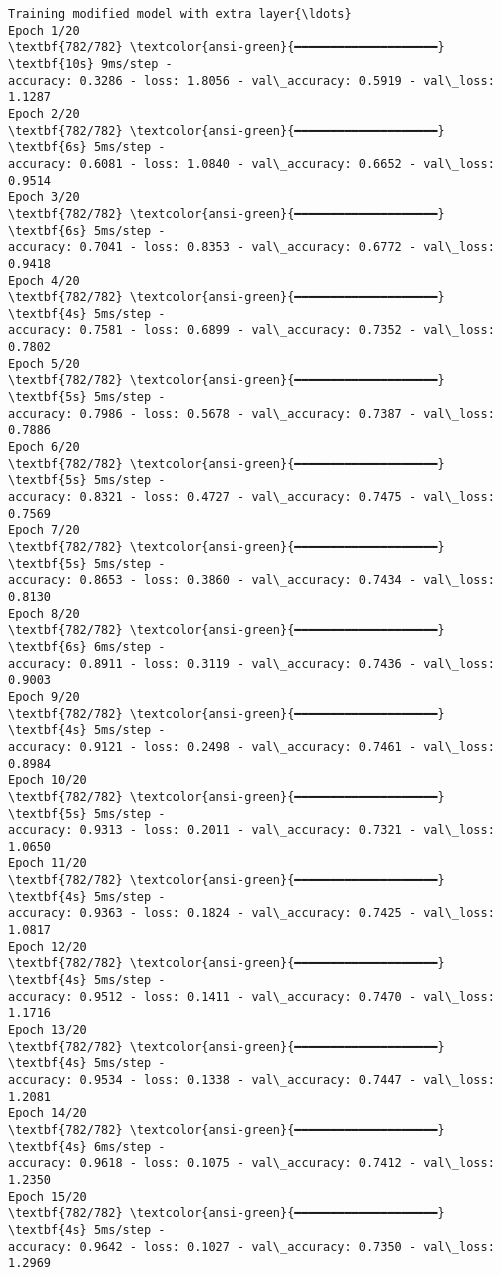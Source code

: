 \documentclass[11pt]{article}
\begin{document}
\begin{Verbatim}[commandchars=\\\{\}]
Training modified model with extra layer{\ldots}
Epoch 1/20
\textbf{782/782} \textcolor{ansi-green}{━━━━━━━━━━━━━━━━━━━━} \textbf{10s} 9ms/step -
accuracy: 0.3286 - loss: 1.8056 - val\_accuracy: 0.5919 - val\_loss: 1.1287
Epoch 2/20
\textbf{782/782} \textcolor{ansi-green}{━━━━━━━━━━━━━━━━━━━━} \textbf{6s} 5ms/step -
accuracy: 0.6081 - loss: 1.0840 - val\_accuracy: 0.6652 - val\_loss: 0.9514
Epoch 3/20
\textbf{782/782} \textcolor{ansi-green}{━━━━━━━━━━━━━━━━━━━━} \textbf{6s} 5ms/step -
accuracy: 0.7041 - loss: 0.8353 - val\_accuracy: 0.6772 - val\_loss: 0.9418
Epoch 4/20
\textbf{782/782} \textcolor{ansi-green}{━━━━━━━━━━━━━━━━━━━━} \textbf{4s} 5ms/step -
accuracy: 0.7581 - loss: 0.6899 - val\_accuracy: 0.7352 - val\_loss: 0.7802
Epoch 5/20
\textbf{782/782} \textcolor{ansi-green}{━━━━━━━━━━━━━━━━━━━━} \textbf{5s} 5ms/step -
accuracy: 0.7986 - loss: 0.5678 - val\_accuracy: 0.7387 - val\_loss: 0.7886
Epoch 6/20
\textbf{782/782} \textcolor{ansi-green}{━━━━━━━━━━━━━━━━━━━━} \textbf{5s} 5ms/step -
accuracy: 0.8321 - loss: 0.4727 - val\_accuracy: 0.7475 - val\_loss: 0.7569
Epoch 7/20
\textbf{782/782} \textcolor{ansi-green}{━━━━━━━━━━━━━━━━━━━━} \textbf{5s} 5ms/step -
accuracy: 0.8653 - loss: 0.3860 - val\_accuracy: 0.7434 - val\_loss: 0.8130
Epoch 8/20
\textbf{782/782} \textcolor{ansi-green}{━━━━━━━━━━━━━━━━━━━━} \textbf{6s} 6ms/step -
accuracy: 0.8911 - loss: 0.3119 - val\_accuracy: 0.7436 - val\_loss: 0.9003
Epoch 9/20
\textbf{782/782} \textcolor{ansi-green}{━━━━━━━━━━━━━━━━━━━━} \textbf{4s} 5ms/step -
accuracy: 0.9121 - loss: 0.2498 - val\_accuracy: 0.7461 - val\_loss: 0.8984
Epoch 10/20
\textbf{782/782} \textcolor{ansi-green}{━━━━━━━━━━━━━━━━━━━━} \textbf{5s} 5ms/step -
accuracy: 0.9313 - loss: 0.2011 - val\_accuracy: 0.7321 - val\_loss: 1.0650
Epoch 11/20
\textbf{782/782} \textcolor{ansi-green}{━━━━━━━━━━━━━━━━━━━━} \textbf{4s} 5ms/step -
accuracy: 0.9363 - loss: 0.1824 - val\_accuracy: 0.7425 - val\_loss: 1.0817
Epoch 12/20
\textbf{782/782} \textcolor{ansi-green}{━━━━━━━━━━━━━━━━━━━━} \textbf{4s} 5ms/step -
accuracy: 0.9512 - loss: 0.1411 - val\_accuracy: 0.7470 - val\_loss: 1.1716
Epoch 13/20
\textbf{782/782} \textcolor{ansi-green}{━━━━━━━━━━━━━━━━━━━━} \textbf{4s} 5ms/step -
accuracy: 0.9534 - loss: 0.1338 - val\_accuracy: 0.7447 - val\_loss: 1.2081
Epoch 14/20
\textbf{782/782} \textcolor{ansi-green}{━━━━━━━━━━━━━━━━━━━━} \textbf{4s} 6ms/step -
accuracy: 0.9618 - loss: 0.1075 - val\_accuracy: 0.7412 - val\_loss: 1.2350
Epoch 15/20
\textbf{782/782} \textcolor{ansi-green}{━━━━━━━━━━━━━━━━━━━━} \textbf{4s} 5ms/step -
accuracy: 0.9642 - loss: 0.1027 - val\_accuracy: 0.7350 - val\_loss: 1.2969

\end{Verbatim}
\end{document}

